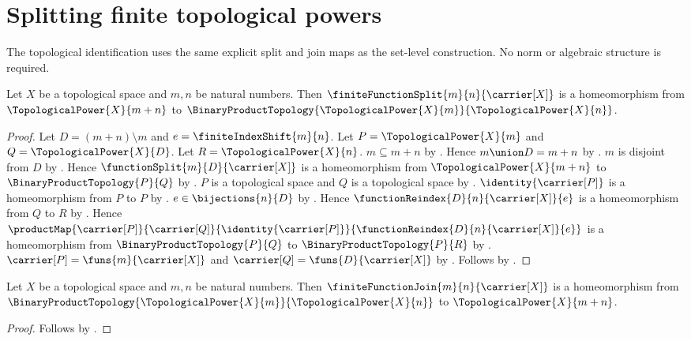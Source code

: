 \section{Splitting finite topological powers}





The topological identification uses the same explicit split and join maps as
the set-level construction. No norm or algebraic structure is required.

\begin{theorem}\label{finite_power_split_homeomorphism}
    Let $X$ be a topological space and $m,n$ be natural numbers.
    Then $\finiteFunctionSplit{m}{n}{\carrier[X]}$ is a homeomorphism from
        $\TopologicalPower{X}{m+n}$ to
        $\BinaryProductTopology{\TopologicalPower{X}{m}}{\TopologicalPower{X}{n}}$.
\end{theorem}
\begin{proof}
    Let $D=(m+n)\setminus m$ and $e=\finiteIndexShift{m}{n}$.
    Let $P=\TopologicalPower{X}{m}$ and $Q=\TopologicalPower{X}{D}$.
    Let $R=\TopologicalPower{X}{n}$.
    $m\subseteq m+n$ by .
    Hence $m\union D=m+n$ by .
    $m$ is disjoint from $D$ by .
    Hence $\functionSplit{m}{D}{\carrier[X]}$ is a homeomorphism from
        $\TopologicalPower{X}{m+n}$ to $\BinaryProductTopology{P}{Q}$ by
        .
    $P$ is a topological space and $Q$ is a topological space by
        .
    $\identity{\carrier[P]}$ is a homeomorphism from $P$ to $P$ by
        .
    $e\in\bijections{n}{D}$ by .
    Hence $\functionReindex{D}{n}{\carrier[X]}{e}$ is a homeomorphism from $Q$ to $R$ by
        .
    Hence $\productMap{\carrier[P]}{\carrier[Q]}{
        \identity{\carrier[P]}}{\functionReindex{D}{n}{\carrier[X]}{e}}$ is a homeomorphism
        from $\BinaryProductTopology{P}{Q}$ to $\BinaryProductTopology{P}{R}$ by
        .
    $\carrier[P]=\funs{m}{\carrier[X]}$ and $\carrier[Q]=\funs{D}{\carrier[X]}$ by
        .
    Follows by .
\end{proof}

\begin{theorem}\label{finite_power_join_homeomorphism}
    Let $X$ be a topological space and $m,n$ be natural numbers.
    Then $\finiteFunctionJoin{m}{n}{\carrier[X]}$ is a homeomorphism from
        $\BinaryProductTopology{\TopologicalPower{X}{m}}{\TopologicalPower{X}{n}}$ to
        $\TopologicalPower{X}{m+n}$.
\end{theorem}
\begin{proof}
    Follows by .
\end{proof}

